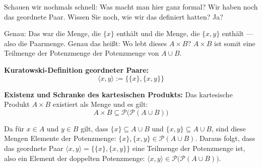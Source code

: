 \begin{math-stroke}
\end{math-stroke}

\begin{spoken-clean}[continued]
Schauen wir nochmals schnell: Was macht man hier ganz formal? Wir haben noch das geordnete Paar. Wissen Sie noch, wie wir das definiert hatten? Ja?

Genau: Das war die Menge, die $\{x\}$ enthält und die Menge, die $\{x, y\}$ enthält --- also die Paarmenge. Genau das heißt: Wo lebt dieses $A \times B$? $A \times B$ ist somit eine Teilmenge der Potenzmenge der Potenzmenge von $A \cup B$.
\end{spoken-clean}

\begin{math-stroke}
\textbf{Kuratowski-Definition geordneter Paare:}
\[
\langle x, y \rangle := \bigl\{ \{x\}, \{x, y\} \bigr\}
\]

\textbf{Existenz und Schranke des kartesischen Produkts:}
Das kartesische Produkt $A \times B$ existiert als Menge und es gilt:
\[
A \times B \subseteq \mathcal{P}\bigl(\mathcal{P}(A \cup B)\bigr)
\]
\begin{explanation-of-steps}
Da für $x \in A$ und $y \in B$ gilt, dass $\{x\} \subseteq A \cup B$ und $\{x, y\} \subseteq A \cup B$, sind diese Mengen Elemente der Potenzmenge: $\{x\}, \{x, y\} \in \mathcal{P}(A \cup B)$. 
Daraus folgt, dass das geordnete Paar $\langle x, y \rangle = \{\{x\}, \{x, y\}\}$ eine Teilmenge der Potenzmenge ist, also ein Element der doppelten Potenzmenge: $\langle x, y \rangle \in \mathcal{P}\bigl(\mathcal{P}(A \cup B)\bigr)$.
\end{explanation-of-steps}
\end{math-stroke}

